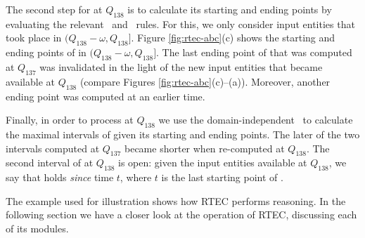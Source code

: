 The second step for  at $Q_{138}$ is to calculate its starting and ending points by evaluating the relevant \initiatedAt\ and \terminatedAt\ rules. For this, we only consider input entities that took place in $(Q_{138}{-}\omega, Q_{138}]$. 
Figure \ref{fig:rtec-abc}(c) shows the starting and ending points of  in $(Q_{138}{-}\omega, Q_{138}]$. The last ending point of  that was computed at $Q_{137}$ was invalidated in the light of the new input entities that became available at $Q_{138}$ (compare Figures \ref{fig:rtec-abc}(c)--(a)). Moreover, another ending point was computed at an earlier time.  

Finally, in order to process  at $Q_{138}$ we use the domain-independent \holdsFor\ to calculate the maximal intervals of  given its starting and ending points. The later of the  two  intervals computed at $Q_{137}$ became shorter when re-computed at $Q_{138}$. The second interval of  at $Q_{138}$ is open: given the input entities available at $Q_{138}$, we say that  holds \emph{since} time $t$, where $t$ is the last starting point of .

The example used for illustration shows how RTEC performs reasoning. In the following section we have a closer look at the operation of RTEC, discussing each of its modules.


